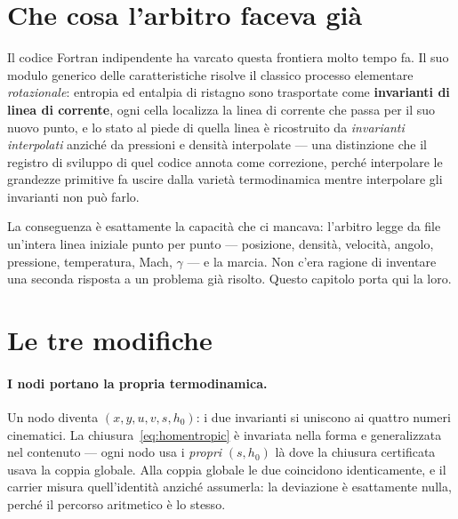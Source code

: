 \section{Che cosa l'arbitro faceva già}

Il codice Fortran indipendente ha varcato questa frontiera molto
tempo fa. Il suo modulo generico delle caratteristiche risolve il
classico processo elementare \emph{rotazionale}: entropia ed entalpia
di ristagno sono trasportate come \textbf{invarianti di linea di
corrente}, ogni cella localizza la linea di corrente che passa per il
suo nuovo punto, e lo stato al piede di quella linea è ricostruito da
\emph{invarianti interpolati} anziché da pressioni e densità
interpolate --- una distinzione che il registro di sviluppo di quel
codice annota come correzione, perché interpolare le grandezze
primitive fa uscire dalla varietà termodinamica mentre interpolare
gli invarianti non può farlo.

La conseguenza è esattamente la capacità che ci mancava: l'arbitro
legge da file un'intera linea iniziale punto per punto --- posizione,
densità, velocità, angolo, pressione, temperatura, Mach, $\gamma$ ---
e la marcia. Non c'era ragione di inventare una seconda risposta a un
problema già risolto. Questo capitolo porta qui la loro.

\section{Le tre modifiche}

\paragraph{I nodi portano la propria termodinamica.} Un nodo diventa
$(x, y, u, v, s, h_0)$: i due invarianti si uniscono ai quattro numeri
cinematici. La chiusura~\eqref{eq:homentropic} è invariata nella
forma e generalizzata nel contenuto --- ogni nodo usa i \emph{propri}
$(s, h_0)$ là dove la chiusura certificata usava la coppia globale.
Alla coppia globale le due coincidono identicamente, e il carrier
misura quell'identità anziché assumerla: la deviazione è esattamente
nulla, perché il percorso aritmetico è lo stesso.

